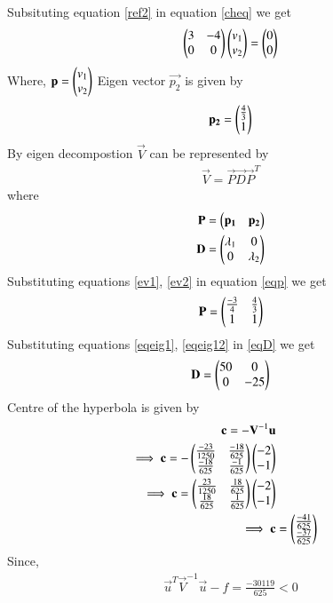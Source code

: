 \documentclass[journal,12pt,twocolumn]{IEEEtran}
\begin{document}
Subsituting equation \eqref{ref2} in equation \eqref{cheq} we get 
\begin{align}
    \begin{pmatrix}3&-4\\0&0\end{pmatrix}\begin{pmatrix}v_1\\v_2\end{pmatrix}=\begin{pmatrix}0\\0\end{pmatrix}\label{eig2}
\end{align}
Where, $\mathbf{p}=\begin{pmatrix}v_1\\v_2\end{pmatrix}$
Eigen vector $\vec{p_2}$ is given by
\begin{align}
        \mathbf{p_2}=\begin{pmatrix}\frac{4}{3}\\1\end{pmatrix}\label{ev2}
\end{align}
By eigen decompostion $\vec{V}$ can be represented by
\begin{align}
    \vec{V}=\vec{P}\vec{D}\vec{P}^T\label{evd}
\end{align}
where 
\begin{align}
        \mathbf{P}=\begin{pmatrix}\mathbf{p_1} & \mathbf{p_2}\end{pmatrix}\label{eqp}\\
    \mathbf{D}=\begin{pmatrix}\lambda_1 & 0 \\0 & \lambda_2\end{pmatrix}\label{eqD}
\end{align}
Substituting equations \eqref{ev1}, \eqref{ev2} in equation \ref{eqp} we get 
\begin{align}
    \mathbf{P}=\begin{pmatrix}\frac{-3}{4}&\frac{4}{3}\\1&1\end{pmatrix}\label{eqP}
\end{align}
Substituting equations \eqref{eqeig1}, \eqref{eqeig12} in \ref{eqD} we get
\begin{align}
       \mathbf{D}=\begin{pmatrix}50 & 0\\0 & -25\end{pmatrix}\label{eqDD}
\end{align}
Centre of the hyperbola is given by 
\begin{align}
    \mathbf{c}=-\mathbf{V}^{-1}\mathbf{u}\\
    \implies\mathbf{c}=-\begin{pmatrix}\frac{-23}{1250}&\frac{-18}{625}\\\frac{-18}{625}&\frac{-1}{625}\end{pmatrix}\begin{pmatrix}-2\\-1\end{pmatrix}\\
    \implies\mathbf{c}=\begin{pmatrix}\frac{23}{1250}&\frac{18}{625}\\\frac{18}{625}&\frac{1}{625}\end{pmatrix}\begin{pmatrix}-2\\-1\end{pmatrix}\\
    \implies\mathbf{c}&=\begin{pmatrix}\frac{-41}{625}\\\frac{-37}{625}\end{pmatrix}
\end{align}
Since,
\begin{align}
    \vec{u}^T\vec{V}^{-1}\vec{u}-f = \frac{-30119}{625}<0\label{cond}
\end{align} 
\end{document}
